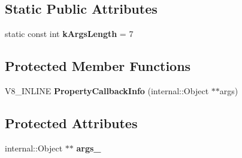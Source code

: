 \subsection*{Static Public Attributes}
\begin{DoxyCompactItemize}
\item 
static const int {\bfseries k\+Args\+Length} = 7\hypertarget{classv8_1_1_property_callback_info_a9fc9663a2e23f9324fe61f92d1e7e5b5}{}\label{classv8_1_1_property_callback_info_a9fc9663a2e23f9324fe61f92d1e7e5b5}

\end{DoxyCompactItemize}
\subsection*{Protected Member Functions}
\begin{DoxyCompactItemize}
\item 
V8\+\_\+\+I\+N\+L\+I\+NE {\bfseries Property\+Callback\+Info} (internal\+::\+Object $\ast$$\ast$args)\hypertarget{classv8_1_1_property_callback_info_aa666043c86d4db9a57a3ac866c78ee0e}{}\label{classv8_1_1_property_callback_info_aa666043c86d4db9a57a3ac866c78ee0e}

\end{DoxyCompactItemize}
\subsection*{Protected Attributes}
\begin{DoxyCompactItemize}
\item 
internal\+::\+Object $\ast$$\ast$ {\bfseries args\+\_\+}\hypertarget{classv8_1_1_property_callback_info_a57b2243627071c62ed3900a741a41a0b}{}\label{classv8_1_1_property_callback_info_a57b2243627071c62ed3900a741a41a0b}

\end{DoxyCompactItemize}
